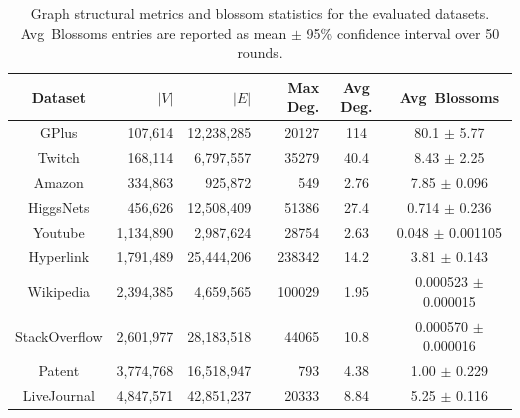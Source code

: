 \begin{table}[h]
 \footnotesize
 \centering
 \setlength{\tabcolsep}{9pt}
 \renewcommand{\arraystretch}{1.0}
 \begin{tabular*}{\textwidth}{@{\extracolsep{\fill}}c|rrrcc}
 \toprule
 Dataset &
 $|V|$ &
 $|E|$ &
 Max Deg. &
 Avg Deg. &
 Avg~Blossoms \\
 \midrule
 GPlus & 107,614 & 12,238,285 & 20127 & 114 & 80.1 {\tiny $\pm$ 5.77} \\
 Twitch & 168,114 & 6,797,557 & 35279 & 40.4 & 8.43 {\tiny $\pm$ 2.25} \\
 Amazon & 334,863 & 925,872 & 549 & 2.76 & 7.85 {\tiny $\pm$ 0.096} \\
 HiggsNets & 456,626 & 12,508,409 & 51386 & 27.4 & 0.714 {\tiny $\pm$ 0.236} \\
 Youtube & 1,134,890 & 2,987,624 & 28754 & 2.63 & 0.048 {\tiny $\pm$ 0.001105} \\
 Hyperlink & 1,791,489 & 25,444,206 & 238342 & 14.2 & 3.81 {\tiny $\pm$ 0.143} \\
 Wikipedia & 2,394,385 & 4,659,565 & 100029 & 1.95 & 0.000523 {\tiny $\pm$ 0.000015} \\
 StackOverflow & 2,601,977 & 28,183,518 & 44065 & 10.8 & 0.000570 {\tiny $\pm$ 0.000016} \\
 Patent & 3,774,768 & 16,518,947 & 793 & 4.38 & 1.00 {\tiny $\pm$ 0.229} \\
 LiveJournal & 4,847,571 & 42,851,237 & 20333 & 8.84 & 5.25 {\tiny $\pm$ 0.116} \\
 \bottomrule
 \end{tabular*}
 \captionsetup{skip=4pt}
 \caption{
 Graph structural metrics and blossom statistics for the evaluated datasets.
 Avg~Blossoms entries are reported as mean $\pm$ 95\% confidence interval over 50 rounds.
 }
 \label{tab:graph-metrics}
\vspace{-4pt}
\end{table}

